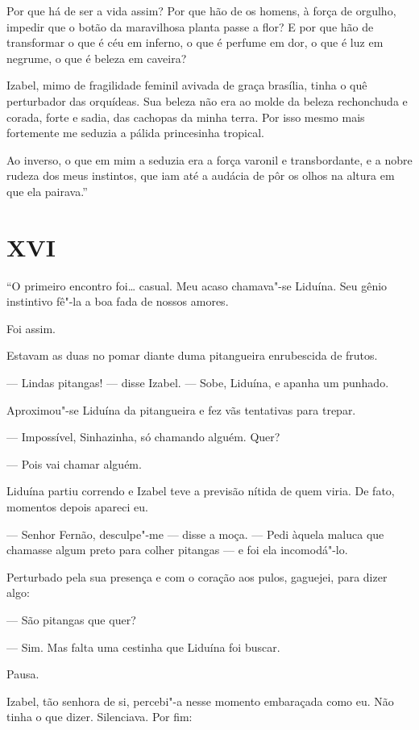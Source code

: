 Por que há de ser a vida assim? Por que hão de os homens, à força de
orgulho, impedir que o botão da maravilhosa planta passe a flor? E por
que hão de transformar o que é céu em inferno, o que é perfume em dor, o
que é luz em negrume, o que é beleza em caveira?

Izabel, mimo de fragilidade feminil avivada de graça brasília, tinha o
quê perturbador das orquídeas. Sua beleza não era ao molde da beleza
rechonchuda e corada, forte e sadia, das cachopas da minha terra. Por
isso mesmo mais fortemente me seduzia a pálida princesinha tropical.

Ao inverso, o que em mim a seduzia era a força varonil e transbordante,
e a nobre rudeza dos meus instintos, que iam até a audácia de pôr os
olhos na altura em que ela pairava.''

\section*{XVI}

``O primeiro encontro foi\ldots{} casual. Meu acaso chamava"-se Liduína. Seu
gênio instintivo fê"-la a boa fada de nossos amores.

Foi assim.

Estavam as duas no pomar diante duma pitangueira enrubescida de frutos.

--- Lindas pitangas! --- disse Izabel. --- Sobe, Liduína, e apanha um
punhado.

Aproximou"-se Liduína da pitangueira e fez vãs tentativas para trepar.

--- Impossível, Sinhazinha, só chamando alguém. Quer?

--- Pois vai chamar alguém.

Liduína partiu correndo e Izabel teve a previsão nítida de quem viria.
De fato, momentos depois apareci eu.

--- Senhor Fernão, desculpe"-me --- disse a moça. --- Pedi àquela maluca
que chamasse algum preto para colher pitangas --- e foi ela incomodá"-lo.

Perturbado pela sua presença e com o coração aos pulos, gaguejei, para
dizer algo:

--- São pitangas que quer?

--- Sim. Mas falta uma cestinha que Liduína foi buscar.

Pausa.

Izabel, tão senhora de si, percebi"-a nesse momento embaraçada como eu.
Não tinha o que dizer. Silenciava. Por fim:

